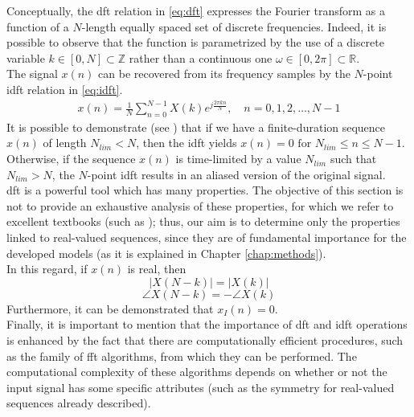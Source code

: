 \noindent Conceptually, the \gls{dft} relation in \ref{eq:dft} expresses the Fourier transform as a function of a $N$-length equally spaced set of discrete frequencies. Indeed, it is possible to observe that the function is parametrized by the use of a discrete variable $k \in [0,N] \subset \mathbb{Z}$ rather than a continuous one $\omega\in [0,2\pi] \subset \mathbb{R}$.\\
The signal $x(n)$ can be recovered from its frequency samples by the $N$-point \gls{idft} relation in \ref{eq:idft}. 
\begin{align}\label{eq:idft}
	x(n) = \frac{1}{N} \sum_{n=0}^{N-1} X(k) e^{j \frac{2 \pi k n}{N}}, \quad n=0,1,2, \ldots, N-1
\end{align}
\noindent It is possible to demonstrate (see \cite{proakis2006dimitris}) that if we have a finite-duration sequence $x(n)$ of length $N_{lim}<N$, then the \gls{idft} yields $x(n) = 0 \text{ for } N_{lim} \leq n \leq{N-1}$. Otherwise, if the sequence $x(n)$ is time-limited by a value $N_{lim}$ such that $N_{lim}>N$, the $N$-point \gls{idft} results in an aliased version of the original signal. \\
\gls{dft} is a powerful tool which has many properties. The objective of this section is not to provide an exhaustive analysis of these properties, for which we refer to excellent textbooks (such as \cite{proakis2006dimitris}); thus, our aim is to determine only the properties linked to real-valued sequences, since they are of fundamental importance for the developed models (as it is explained in Chapter \ref{chap:methods}).\\
In this regard, if $x(n)$ is real, then 
$$|X(N-k)|=|X(k)|$$ 
$$\angle X(N-k)=-\angle X(k)$$
Furthermore, it can be demonstrated that $x_{I}(n)= 0$.\\
Finally, it is important to mention that the importance of \gls{dft} and \gls{idft} operations is enhanced by the fact that there are computationally efficient procedures, such as the family of \gls{fft} algorithms, from which they can be performed. The computational complexity of these algorithms depends on whether or not the input signal has some specific attributes (such as the symmetry for real-valued sequences already described).

